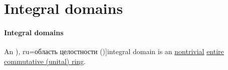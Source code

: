 \section{Integral domains}\label{sec:integral_domains}

\paragraph{Integral domains}

\begin{definition}\label{def:integral_domain}
  An \term[bg=област на цялостност (\cite[393]{Обрешков1962ВисшаАлгебра}), ru=область целостности (\cite[def. 3.5.1]{Винберг2014Алгебра})]{integral domain} is an \hyperref[def:ring/trivial]{nontrivial} \hyperref[def:entire_semiring]{entire} \hyperref[def:ring/commutative]{commutative (unital) ring}.
\end{definition}

